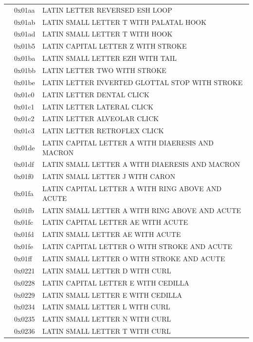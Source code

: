 \documentclass[12pt, twoside]{article}
\begin{document}
\begin{longtable}{L{1.0cm} L{2.0cm} >{\footnotesize}L{10cm}}
&0x01aa&LATIN LETTER REVERSED ESH LOOP\\
&0x01ab&LATIN SMALL LETTER T WITH PALATAL HOOK\\
&0x01ad&LATIN SMALL LETTER T WITH HOOK\\
&0x01b5&LATIN CAPITAL LETTER Z WITH STROKE\\
&0x01ba&LATIN SMALL LETTER EZH WITH TAIL\\
&0x01bb&LATIN LETTER TWO WITH STROKE\\
&0x01be&LATIN LETTER INVERTED GLOTTAL STOP WITH STROKE\\
&0x01c0&LATIN LETTER DENTAL CLICK\\
&0x01c1&LATIN LETTER LATERAL CLICK\\
&0x01c2&LATIN LETTER ALVEOLAR CLICK\\
&0x01c3&LATIN LETTER RETROFLEX CLICK\\
&0x01de&LATIN CAPITAL LETTER A WITH DIAERESIS AND MACRON\\
&0x01df&LATIN SMALL LETTER A WITH DIAERESIS AND MACRON\\
&0x01f0&LATIN SMALL LETTER J WITH CARON\\
&0x01fa&LATIN CAPITAL LETTER A WITH RING ABOVE AND ACUTE\\
&0x01fb&LATIN SMALL LETTER A WITH RING ABOVE AND ACUTE\\
&0x01fc&LATIN CAPITAL LETTER AE WITH ACUTE\\
&0x01fd&LATIN SMALL LETTER AE WITH ACUTE\\
&0x01fe&LATIN CAPITAL LETTER O WITH STROKE AND ACUTE\\
&0x01ff&LATIN SMALL LETTER O WITH STROKE AND ACUTE\\
&0x0221&LATIN SMALL LETTER D WITH CURL\\
&0x0228&LATIN CAPITAL LETTER E WITH CEDILLA\\
&0x0229&LATIN SMALL LETTER E WITH CEDILLA\\
&0x0234&LATIN SMALL LETTER L WITH CURL\\
&0x0235&LATIN SMALL LETTER N WITH CURL\\
&0x0236&LATIN SMALL LETTER T WITH CURL\\

\end{longtable}
\end{document}
